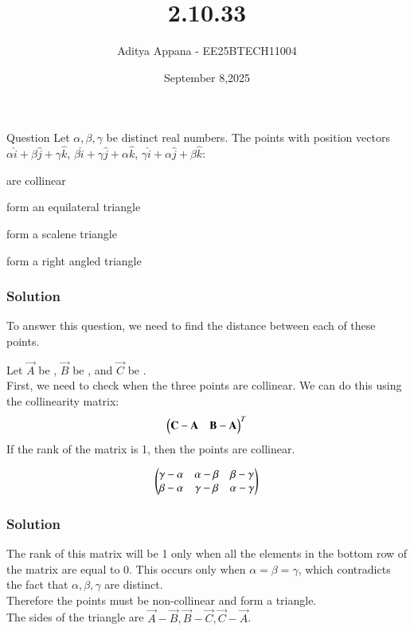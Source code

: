 \documentclass{beamer}
\title %
{2.10.33}
\date{September 8,2025}
\author %
{Aditya Appana - EE25BTECH11004}
\begin{document}
\frame{\titlepage}
\begin{frame}{Question}
Let $\alpha , \beta, \gamma$ be distinct real numbers. The points with position vectors $\alpha\hat{i} + \beta\hat{j} + \gamma\hat{k}$, $\beta\hat{i} +\gamma\hat{j} + \alpha\hat{k}$, $\gamma\hat{i} + \alpha\hat{j} + \beta\hat{k}$:

\begin{enumerate}\begin{multicols}{2}
    \item are collinear
    \item form an equilateral triangle
    \item form a scalene triangle
    \item form a right angled triangle
    \end{multicols}
\end{enumerate}
\end{frame}



\begin{frame}[fragile]
    \frametitle{Solution}

To answer this question, we need to find the distance between each of these points.

Let $\vec{A}$ be \myvec{\alpha \\ \beta \\ \gamma}, $\vec{B}$ be \myvec{ \beta \\ \gamma \\ \alpha}, and $\vec{C}$ be \myvec{\gamma \\ \alpha \\ \beta}. \\

First, we need to check when the three points are collinear. We can do this using the collinearity matrix: \begin{align}\begin{pmatrix}\mathbf{C}-\mathbf{A} & \mathbf{B} - \mathbf{A}\end{pmatrix}^T\end{align}If the rank of the matrix is 1, then the points are collinear.

    
\begin{align}
\begin{pmatrix}\gamma - \alpha & \alpha - \beta & \beta - \gamma \\ \beta - \alpha & \gamma - \beta & \alpha - \gamma\end{pmatrix}
\end{align}


\end{frame}


\begin{frame}[fragile]
    \frametitle{Solution}
    
The rank of this matrix will be 1 only when all the elements in the bottom row of the matrix are equal to 0. This occurs only when $\alpha = \beta = \gamma$, which contradicts the fact that $\alpha, \beta, \gamma$ are distinct.\\

Therefore the points must be non-collinear and form a triangle.\\

The sides of the triangle are $\vec{A} - \vec{B}, \vec{B} - \vec{C}, \vec{C}- \vec{A}$.\\

\end{frame}
\end{document}
